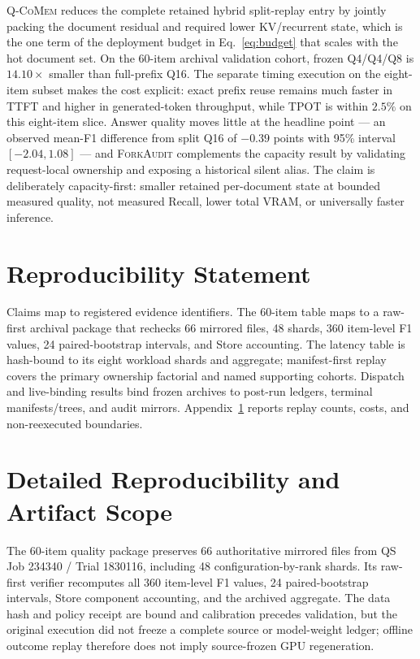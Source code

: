 \documentclass{article}
\newcommand{\qcomem}{\textsc{Q-CoMem}}
\newcommand{\method}{\textsc{ForkAudit}}
\begin{document}
\qcomem{} reduces the complete retained hybrid split-replay entry by jointly
packing the document residual and required lower KV/recurrent state, which is
the one term of the deployment budget in Eq.~\ref{eq:budget} that scales with
the hot document set.  On the 60-item archival validation cohort, frozen
Q4/Q4/Q8 is $14.10\times$ smaller than full-prefix Q16.  The separate timing
execution on the eight-item subset makes the cost explicit: exact prefix reuse
remains much faster in TTFT and higher in generated-token throughput, while
TPOT is within $2.5\%$ on this eight-item slice.  Answer quality moves little at
the headline point --- an observed mean-F1 difference from split Q16 of $-0.39$
points with 95\% interval $[-2.04,1.08]$ --- and \method{} complements the
capacity result by validating request-local ownership and exposing a historical
silent alias.  The claim is deliberately capacity-first: smaller retained
per-document state at bounded measured quality, not measured Recall, lower total
VRAM, or universally faster inference.

\section*{Reproducibility Statement}
Claims map to registered evidence identifiers.  The 60-item table maps to a
raw-first archival package that rechecks 66 mirrored files, 48 shards, 360
item-level F1 values, 24 paired-bootstrap intervals, and Store accounting.  The
latency table is hash-bound to its eight workload shards and aggregate;
manifest-first replay covers the primary ownership factorial and named
supporting cohorts.  Dispatch and live-binding results bind frozen archives to
post-run ledgers, terminal manifests/trees, and audit mirrors.
Appendix~\ref{app:reproducibility} reports replay counts, costs, and
non-reexecuted boundaries.




\appendix

\section{Detailed Reproducibility and Artifact Scope}
\label{app:reproducibility}

The 60-item quality package preserves 66 authoritative mirrored files from QS
Job 234340 / Trial 1830116, including 48 configuration-by-rank shards.  Its
raw-first verifier recomputes all 360 item-level F1 values, 24 paired-bootstrap
intervals, Store component accounting, and the archived aggregate.  The data
hash and policy receipt are bound and calibration precedes validation, but the
original execution did not freeze a complete source or model-weight ledger;
offline outcome replay therefore does not imply source-frozen GPU regeneration.
\end{document}
